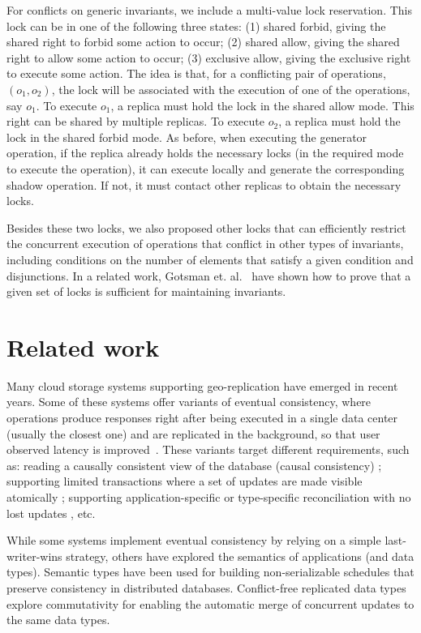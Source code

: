 \documentclass[11pt,dvipdfm]{article}
\begin{document}
For conflicts on generic invariants, we include a multi-value lock
reservation. This lock can be in one of the following three states:
(1) shared forbid, giving the shared right to forbid some action to occur;
(2) shared allow, giving the shared right to allow some action to occur;
(3) exclusive allow, giving the exclusive right to execute some action.
The idea is that, for a conflicting pair of operations, $(o_1,o_2)$,
the lock will be associated with the execution of one of the operations,
say $o_1$.
To execute $o_1$, a replica must hold the lock in the shared allow mode.
This right can be shared by multiple replicas.
To execute $o_2$, a replica must hold the lock in the shared forbid mode.
As before, when executing the generator operation, if the replica already
holds the necessary locks (in the required mode to execute the operation),
it can execute locally and generate the corresponding shadow operation.
If not, it must contact other replicas to obtain the necessary locks.

Besides these two locks, we also proposed other locks that can
efficiently restrict the concurrent execution of operations that conflict
in other types of invariants, including conditions on the number of elements
that satisfy a given condition and disjunctions.
In a related work, Gotsman et. al.~\cite{GotsmanConsistencyReason}
have shown how to prove that a given set of locks is sufficient
for maintaining invariants.


\section{Related work}
\label{sec:rel}

Many cloud storage systems supporting geo-replication have emerged in recent years.
Some of these systems offer variants of eventual consistency, where operations produce
responses right after being executed in a single data center (usually the closest
one) and are replicated in the background, so that user observed latency is improved~\cite{dynamo,cops,eiger,chainreaction,cassandra}.
These variants target different requirements, such as: reading a causally consistent view of the database (causal consistency) \cite{cops,chainreaction,orbe,bolton}; supporting limited transactions where a set of updates are made visible atomically \cite{eiger,ramp}; supporting application-specific or type-specific reconciliation with no lost updates \cite{dynamo,cops,walter,riak}, etc.

While some systems implement eventual consistency by relying on a simple last-writer-wins
strategy, others have explored the semantics of applications (and data types).
Semantic types \cite{semanticDDB} have been used for building non-serializable
schedules that preserve consistency in distributed databases.
Conflict-free replicated data types~\cite{crdts} explore commutativity
for enabling the automatic merge of concurrent updates to the same data types.
\end{document}
